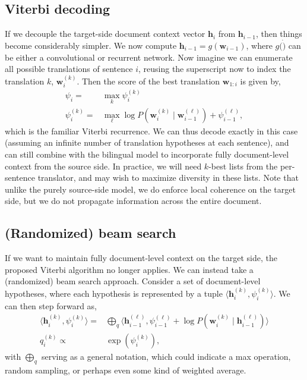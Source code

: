\documentclass[11pt,a4paper]{article}
\renewcommand{\vec}[1]{\mathbf{#1}}
\newcommand{\vh}[0]{\vec{h}}
\newcommand{\vw}[0]{\vec{w}}
\newcommand{\tuple}[1]{\langle #1 \rangle}
\begin{document}
\subsection{Viterbi decoding}
If we decouple the target-side document context vector $\vh_i$ from $\vh_{i-1}$, then things become considerably simpler. We now compute $\vh_{i-1} = g(\vw_{i-1})$, where $g(\dot)$ can be either a convolutional or recurrent network. Now imagine we can enumerate all possible translations of sentence $i$, reusing the superscript now to index the translation $k$, $\vw_i^{(k)}$. Then the score of the best translation $\vw_{1:i}$ is given by,
\begin{align}
\psi_i = & \max_k \psi_i^{(k)}\\
\psi_i^{(k)} = & \max_{\ell} \log P(\vw_i^{(k)} \mid \vw_{i-1}^{(\ell)}) + \psi_{i-1}^{(\ell)},
\end{align}
which is the familiar Viterbi recurrence. We can thus decode exactly in this case (assuming an infinite number of translation hypotheses at each sentence), and can still combine with the bilingual model to incorporate fully document-level context from the source side. In practice, we will need $k$-best lists from the per-sentence translator, and may wish to maximize diversity in these lists. Note that unlike the purely source-side model, we do enforce local coherence on the target side, but we do not propagate information across the entire document. 

\subsection{(Randomized) beam search}
If we want to maintain fully document-level context on the target side, the proposed Viterbi algorithm no longer applies. We can instead take a (randomized) beam search approach. Consider a set of document-level hypotheses, where each hypothesis is represented by a tuple $\tuple{\vh^{(k)}_i, \psi^{(k)}_i}$. We can then step forward as,
\begin{align}
\tuple{\vh^{(k)}_i, \psi^{(k)}_i} = & 
\bigoplus_q \tuple{\vh^{(\ell)}_{i-1}, \psi^{(\ell)}_{i-1}
+ \log P(\vw_i^{(k)} \mid \vh_{i-1}^{(\ell)})}\\
q^{(k)}_i \propto & \exp (\psi^{(k)}_i),
\end{align}
with $\bigoplus_q$ serving as a general notation, which could indicate a max operation, random sampling, or perhaps even some kind of weighted average.



\end{document}
